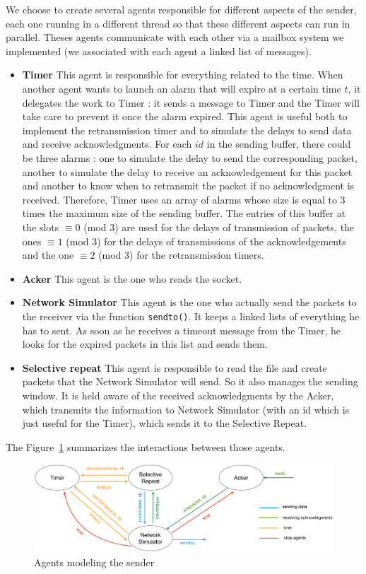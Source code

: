 \documentclass[11pt,a4paper]{article}
\begin{document}
We choose to create several agents responsible for different aspects of the sender, each one running in a different thread so that these different aspects can run in parallel. Theses agents communicate with each other via a mailbox system we implemented (we associated with each agent a linked list of messages).
\begin{itemize}
\item \textbf{Timer} This agent is responsible for everything related to the time. When another agent wants to launch an alarm that will expire at a certain time $t$, it delegates the work to Timer : it sends a message to Timer and the Timer will take care to prevent it once the alarm expired. This agent is useful both to implement the retransmission timer and to simulate the delays to send data and receive acknowledgments. For each $id$ in the sending buffer, there could be three alarms : one to simulate the delay to send the corresponding packet, another to simulate the delay to receive an acknowledgement for this packet and another to know when to retransmit the packet if no acknowledgment is received. Therefore, Timer uses an array of alarms whose size is equal to 3 times the maximum size of the sending buffer. The entries of this buffer at the slots $\equiv 0$ (mod $3$) are used for the delays of transmission of packets, the ones $\equiv 1$ (mod $3$) for the delays of transmissions of the acknowledgements and the one $\equiv 2$ (mod $3$) for the retransmission timers.
\item \textbf{Acker} This agent is the one who reads the socket. 
\item \textbf{Network Simulator} This agent is the one who actually send the packets to the receiver via the function \texttt{sendto()}. It keeps a linked lists of everything he has to sent. As soon as he receives a timeout message from the Timer, he looks for the expired packets in this list and sends them.
\item \textbf{Selective repeat}  This agent is responsible to read the file and create packets that the Network Simulator will send. So it also manages the sending window. It is held aware of the received acknowledgments by the Acker, which transmits the information to Network Simulator (with an id which is just useful for the Timer), which sends it to the Selective Repeat.
\end{itemize}
The Figure~\ref{sender} summarizes the interactions between those agents. 

\begin{figure}[!h]
	\begin{center}
		\includegraphics[width=18cm]{images/sender.eps}
		\caption{Agents modeling the sender}
		\label{sender}
	\end{center}
\end{figure}
\end{document}
